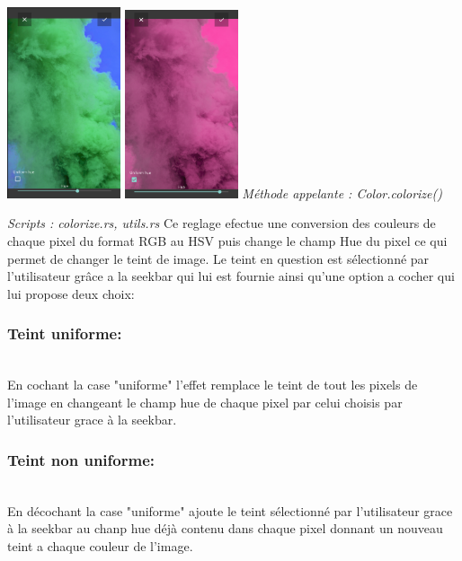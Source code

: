     \includegraphics[width=0.25\textwidth]{report_src/non-uniform-hue.png}
    \includegraphics[width=0.25\textwidth]{report_src/uniform-hue.png}
    \newline
    \emph{Méthode appelante : Color.colorize()}

    \emph{Scripts : colorize.rs, utils.rs} 
    \newline
    Ce reglage efectue une conversion des couleurs de chaque pixel du format RGB au HSV puis change le champ Hue du pixel ce qui permet de 
    changer le teint de image.
    Le teint en question est sélectionné par l'utilisateur grâce a la seekbar qui lui est fournie ainsi qu'une option a cocher qui lui propose deux choix:
    \\

    \subsubsection{Teint uniforme:}
    \\
        En cochant la case "uniforme" l'effet remplace le teint de tout les pixels de l'image en changeant le champ hue de chaque pixel par celui choisis par l'utilisateur grace à la seekbar.
        \\

    \subsubsection{Teint non uniforme:}
    \\
        En décochant la case "uniforme" ajoute le teint sélectionné par l'utilisateur grace à la seekbar au chanp hue déjà contenu dans chaque pixel donnant un nouveau 
        teint a chaque couleur de l'image.
        \\


